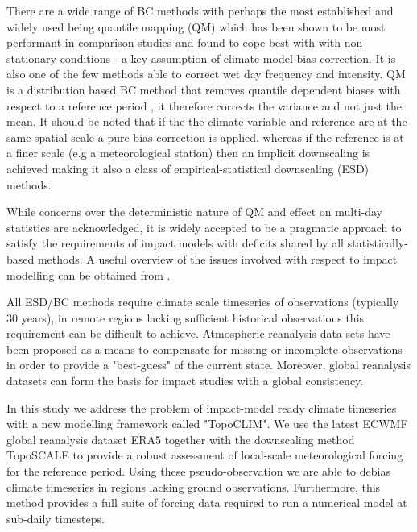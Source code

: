 \documentclass[hess, manuscript]{copernicus}
\begin{document}
There are a wide range of BC methods \citep{Gutmann2014-dq} with perhaps the most established and widely used being quantile mapping (QM) which has been shown to be most performant in comparison studies \citep{Teutschbein2013-nn, Jakob_Themes_l2011-xt} and found to cope best with with non-stationary conditions - a key assumption of climate model bias correction. It is also one of the few methods able to correct wet day frequency and intensity.  QM is a distribution based BC method that removes quantile dependent biases with respect to a reference period \citep{Ivanov2017-lt}, it therefore corrects the variance and not just the mean. It should be noted that if the the climate variable and reference are at the same spatial scale a pure bias correction is applied. whereas if the reference is at a finer scale (e.g a meteorological station) then an implicit downscaling is achieved making it also a class of empirical-statistical downscaling (ESD) methods.

While concerns over the deterministic nature of QM \citep{Maraun2013-gq} and effect on multi-day statistics \citep{Addor2014-ew}  are acknowledged, it is widely accepted to be a pragmatic approach to satisfy the requirements of impact models \citep{Rajczak2016-jk} with deficits shared by all statistically-based methods. A useful overview of the issues involved with respect to impact modelling can be obtained from \citet{Stocker_TF}.


All ESD/BC methods require climate scale timeseries of observations (typically 30 years), in remote regions lacking sufficient historical observations this requirement can be difficult to achieve. Atmospheric reanalysis data-sets have been proposed as a means to compensate for missing or incomplete observations \citep{Cao2019-wx, Fiddes2014-wt} in order to provide a "best-guess" of the current state. Moreover, global reanalysis datasets can form the basis for impact studies with a global consistency. %

In this study we address the problem of impact-model ready climate timeseries with a new modelling framework called "TopoCLIM". We use the latest ECWMF global reanalysis dataset ERA5 together with the downscaling method TopoSCALE \citep{Fiddes2014-wt} to provide a robust assessment of local-scale meteorological forcing for the reference period. Using these pseudo-observation we are able to debias climate timeseries in regions lacking ground observations. Furthermore, this method provides a full suite of forcing data required to run a numerical model at sub-daily timesteps. 
\end{document}
